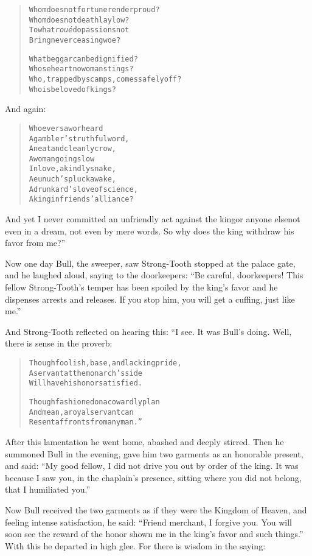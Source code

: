 \documentclass[article, twoside, 14pt]{memoir}
\renewenvironment{verbatim}{%
\begin{quote}%
\vskip -10pt%
\begin{alltt}\normalfont\large}{\end{alltt}%
\end{quote}%
\vskip -10pt
} %
\begin{document}
\begin{verbatim}
Whom does not fortune render proud?
    Whom does not death lay low?
To what \emph{roué} do passions not
    Bring never ceasing woe?

What beggar can be dignified?
    Whose heart no woman stings?
Who, trapped by scamps, comes safely off?
    Who is beloved of kings?
\end{verbatim}
And again:

\begin{verbatim}
Who ever saw or heard
A gambler's truthful word,
A neat and cleanly crow,
A woman going slow
In love, a kindly snake,
A eunuch's pluck awake,
A drunkard's love of science,
A king in friends' alliance?
\end{verbatim}
And yet I never committed an unfriendly act against the king{\textemdash}or
anyone else{\textemdash}not even in a dream, not even by mere words. So why
does the king withdraw his favor from me?”

Now one day Bull, the sweeper, saw Strong-Tooth stopped at the
palace gate, and he laughed aloud, saying to the doorkeepers:
``Be careful, doorkeepers! This fellow Strong-Tooth's temper has been spoiled by the king's favor and he dispenses arrests and releases. If you stop him, you will get a cuffing, just like me.''


And Strong-Tooth reflected on hearing this: “I see. It was Bull's
doing. Well, there is sense in the proverb:

\begin{verbatim}
Though foolish, base, and lacking pride,
A servant at the monarch's side
Will have his honor satisfied.

Though fashioned on a cowardly plan
And mean, a royal servant can
Resent affronts from any man.”
\end{verbatim}
After this lamentation he went home, abashed and deeply stirred.
Then he summoned Bull in the evening, gave him two garments as an
honorable present, and said:
``My good fellow, I did not drive you out by order of the king. It was because I saw you, in the chaplain's presence, sitting where you did not belong, that I humiliated you.''

Now Bull received the two garments as if they were the Kingdom of
Heaven, and feeling intense satisfaction, he said:
``Friend merchant, I forgive you. You will soon see the reward of the honor shown me in the king's favor and such things.''
With this he departed in high glee. For there is wisdom in the
saying:
\end{document}
